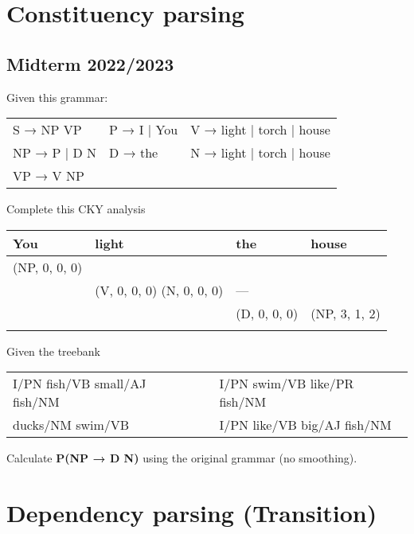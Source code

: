 \documentclass[11pt, a4paper]{article}
\begin{document}
\section{Constituency parsing}

\subsection{Midterm 2022/2023}

Given this grammar:
\begin{center}
	\begin{tabular}{|lll|}
		\hline
		S → NP  VP & P → I | You & V → light | torch | house \\
		NP → P | D N & D → the & N → light | torch | house \\
		VP → V NP & &\\
		\hline
	\end{tabular}
\end{center}

Complete this CKY analysis
\begin{center}
	\begin{tabular}{|p{2cm}|p{2cm}|p{2cm}|p{2cm}|}
		\hline
		You & light & the & house \\
		\hline
		(NP, 0, 0, 0) &&& \\
		\hline
		\multicolumn{1}{l|}{} & (V, 0, 0, 0) \newline (N, 0, 0, 0) & --- & \\
		\cline{2-4}
		\multicolumn{2}{l|}{} & (D, 0, 0, 0) & (NP, 3, 1, 2) \\
		\cline{3-4}
		\multicolumn{3}{l|}{} & \\
		\cline{4-4}
	\end{tabular}
\end{center}

Given the treebank
\begin{center}
	\begin{tabular}{|lll|}
		\hline
		I/PN fish/VB small/AJ fish/NM &&
		I/PN swim/VB like/PR fish/NM \\
		ducks/NM swim/VB &&
		I/PN like/VB big/AJ fish/NM \\
		\hline
	\end{tabular}
\end{center}
Calculate \textbf{P(NP → D N)} using the original grammar (no smoothing).

\section{Dependency parsing (Transition)}
\end{document}
